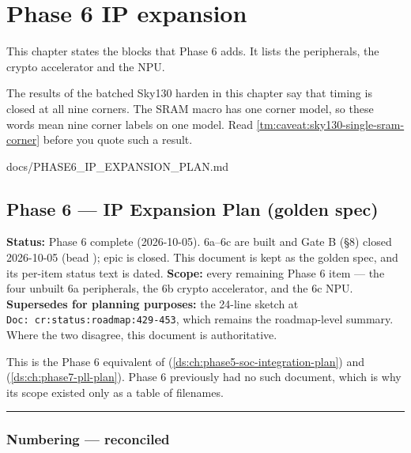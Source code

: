 \chapter{Phase 6 IP expansion}\label{ds:ch:phase-6-ip-expansion}

This chapter states the blocks that Phase 6 adds. It lists the peripherals, the crypto accelerator and the NPU.

\begin{information}
The results of the batched Sky130 harden in this chapter say that timing is closed at all nine corners. The SRAM macro has one corner model, so these words mean nine corner labels on one model. Read \cref{tm:caveat:sky130-single-sram-corner} before you quote such a result.
\end{information}

\begin{relocated}{docs/PHASE6_IP_EXPANSION_PLAN.md}
\section{Phase 6 --- IP Expansion Plan (golden spec)}\label{ds:ch:phase6-ip-expansion-plan}

\textbf{Status:} Phase 6 complete (2026-10-05). 6a--6c are built and
Gate B (§8) closed 2026-10-05 (bead ); epic  is
closed. This document is kept as the golden spec, and its per-item
status text is dated. \textbf{Scope:} every remaining Phase 6 item ---
the four unbuilt 6a peripherals, the 6b crypto accelerator, and the 6c
NPU. \textbf{Supersedes for planning purposes:} the 24-line sketch at
\texttt{Doc:\allowbreak{}\ cr:\allowbreak{}status:\allowbreak{}roadmap:\allowbreak{}429-\allowbreak{}453},
which remains the roadmap-level summary. Where the two disagree, this
document is authoritative.

This is the Phase 6 equivalent of
 (\cref{ds:ch:phase5-soc-integration-plan}) and
 (\cref{ds:ch:phase7-pll-plan}). Phase 6 previously had no
such document, which is why its scope existed only as a table of
filenames.

\begin{center}\rule{0.5\linewidth}{0.5pt}\end{center}

\subsection{Numbering --- reconciled}\label{ds:ch:phase6-ip-expansion-plan:1-numbering-reconciled}


\end{relocated}
